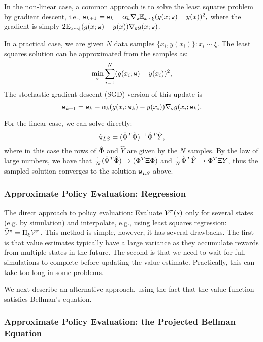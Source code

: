 In the non-linear case, a common approach is to solve the least squares problem by gradient descent, i.e., $\texttt{w}_{k+1} = \texttt{w}_k - \alpha_k \nabla_{\texttt{w}} \mathbb{E}_{x\sim\xi} (g(x;\texttt{w}) - y(x))^2,$ where the gradient is simply $2 \mathbb{E}_{x\sim\xi} (g(x;\texttt{w}) - y(x))\nabla_{\texttt{w}} g(x;\texttt{w})$. 

In a practical case, we are given $N$ data samples $\{ x_i, y(x_i) \}: x_i\sim \xi$. The least squares solution can be approximated from the samples as:
$$
\min_{\texttt{w}} \sum_{i=1}^{N} (g(x_i;\texttt{w}) - y(x_i))^2,
$$
The stochastic gradient descent (SGD) version of this update is
$$
\texttt{w}_{k+1} = \texttt{w}_k - \alpha_k (g(x_i;\texttt{w}_k) - y(x_i))\nabla_{\texttt{w}} g(x_i;\texttt{w}_k).
$$

For the linear case, we can solve directly:
$$
\hat{\texttt{w}}_{LS} = (\hat{\Phi}^T \hat{\Phi})^{-1} \hat{\Phi}^T \hat{Y},
$$
where in this case the rows of $\hat{\Phi}$ and $\hat{Y}$ are given by the $N$ samples. By the law of large numbers, we have that $\frac{1}{N}(\hat{\Phi}^T \hat{\Phi}) \to (\Phi^T \Xi \Phi)$ and $\frac{1}{N}\hat{\Phi}^T \hat{Y} \to \Phi^T \Xi Y$, thus the sampled solution converges to the solution $\texttt{w}_{LS}$ above.

\subsubsection{Approximate Policy Evaluation: Regression}

The direct approach to policy evaluation: Evaluate $\mathcal{V}^\pi(s)$ only for several states (e.g. by simulation) and interpolate, e.g., using least squares regression: $\widehat{\mathcal{V}}^{\pi} = \Pi_{\xi} \mathcal{V}^{\pi}$. This method is simple, however, it has several drawbacks. The first is that value estimates typically have a large variance as they accumulate rewards from multiple states in the future. The second is that we need to wait for full simulations to complete before updating the value estimate. Practically, this can take too long in some problems. 

We next describe an alternative approach, using the fact that the value function satisfies Bellman's equation.

\subsubsection{Approximate Policy Evaluation: the Projected Bellman Equation}

